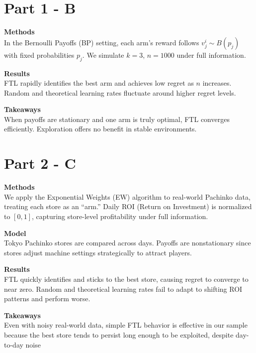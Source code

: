 \documentclass[10pt]{article}
\renewenvironment{shaded}{%
  \def\FrameCommand{\fboxsep=\FrameSep \colorbox{shadecolor}}%
  \MakeFramed{\advance\hsize-\width \FrameRestore\FrameRestore}}%
 {\endMakeFramed}
\begin{document}
\section{Part 1 - B}
\begin{shaded}
\textbf{Methods}\\
In the Bernoulli Payoffs (BP) setting, each arm’s reward follows $v_j^i \sim B(p_j)$ with fixed probabilities $p_j$.  
We simulate $k=3$, $n=1000$ under full information.

\textbf{Results}\\
FTL rapidly identifies the best arm and achieves low regret as $n$ increases.  
Random and theoretical learning rates fluctuate around higher regret levels.

\textbf{Takeaways}\\
When payoffs are stationary and one arm is truly optimal, FTL converges efficiently.  
Exploration offers no benefit in stable environments.
\end{shaded}

\section{Part 2 - C}
\begin{shaded}
\textbf{Methods}\\
We apply the Exponential Weights (EW) algorithm to real-world Pachinko data, treating each store as an ``arm.''  
Daily ROI (Return on Investment) is normalized to $[0,1]$, capturing store-level profitability under full information.

\textbf{Model}\\
Tokyo Pachinko stores are compared across days.  
Payoffs are nonstationary since stores adjust machine settings strategically to attract players.

\textbf{Results}\\
FTL quickly identifies and sticks to the best store, causing regret to converge to near zero. Random and theoretical learning rates fail to adapt to shifting ROI patterns and perform worse.

\textbf{Takeaways}\\
Even with noisy real-world data, simple FTL behavior is effective in our sample because the best store tends to persist long enough to be exploited, despite day-to-day noise
\end{shaded}
\end{document}
